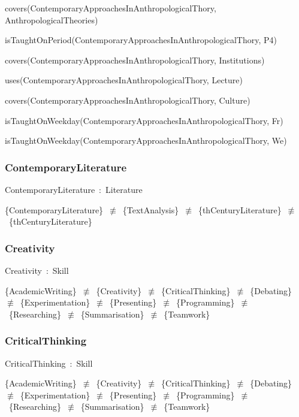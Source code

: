 \documentclass{article}
\begin{document}
covers(ContemporaryApproachesInAnthropologicalThory, AnthropologicalTheories)

isTaughtOnPeriod(ContemporaryApproachesInAnthropologicalThory, P4)

covers(ContemporaryApproachesInAnthropologicalThory, Institutions)

uses(ContemporaryApproachesInAnthropologicalThory, Lecture)

covers(ContemporaryApproachesInAnthropologicalThory, Culture)

isTaughtOnWeekday(ContemporaryApproachesInAnthropologicalThory, Fr)

isTaughtOnWeekday(ContemporaryApproachesInAnthropologicalThory, We)

\subsubsection*{ContemporaryLiterature}

ContemporaryLiterature~:~Literature

\{ContemporaryLiterature\}~\ensuremath{\not\equiv}~\{TextAnalysis\}~\ensuremath{\not\equiv}~\{thCenturyLiterature\}~\ensuremath{\not\equiv}~\{thCenturyLiterature\}

\subsubsection*{Creativity}

Creativity~:~Skill

\{AcademicWriting\}~\ensuremath{\not\equiv}~\{Creativity\}~\ensuremath{\not\equiv}~\{CriticalThinking\}~\ensuremath{\not\equiv}~\{Debating\}~\ensuremath{\not\equiv}~\{Experimentation\}~\ensuremath{\not\equiv}~\{Presenting\}~\ensuremath{\not\equiv}~\{Programming\}~\ensuremath{\not\equiv}~\{Researching\}~\ensuremath{\not\equiv}~\{Summarisation\}~\ensuremath{\not\equiv}~\{Teamwork\}

\subsubsection*{CriticalThinking}

CriticalThinking~:~Skill

\{AcademicWriting\}~\ensuremath{\not\equiv}~\{Creativity\}~\ensuremath{\not\equiv}~\{CriticalThinking\}~\ensuremath{\not\equiv}~\{Debating\}~\ensuremath{\not\equiv}~\{Experimentation\}~\ensuremath{\not\equiv}~\{Presenting\}~\ensuremath{\not\equiv}~\{Programming\}~\ensuremath{\not\equiv}~\{Researching\}~\ensuremath{\not\equiv}~\{Summarisation\}~\ensuremath{\not\equiv}~\{Teamwork\}
\end{document}

